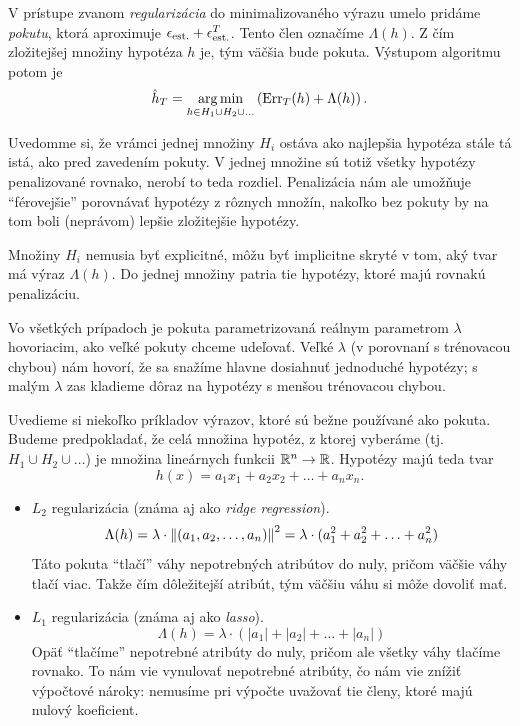V prístupe zvanom \emph{regularizácia} do minimalizovaného výrazu umelo
pridáme \emph{pokutu}, ktorá aproximuje ${\epsilon_\text{est.}} + {\epsilon^T_\text{est.}}$. Tento člen
označíme $\Lambda(h)$. Z čím zložitejšej množiny hypotéza $h$ je, tým
väčšia bude pokuta. Výstupom algoritmu potom je
$$\hat{h}_T = \operatorname*{{arg\,min}}_{h \in H_1 \cup H_2 \cup \ldots} \left( \mathrm{Err}_T(h) + \Lambda(h) \right).$$

Uvedomme si, že vrámci jednej množiny $H_i$ ostáva ako najlepšia
hypotéza stále tá istá, ako pred zavedením pokuty. V jednej množine
sú totiž všetky hypotézy penalizované rovnako, nerobí to teda rozdiel.
Penalizácia nám ale umožňuje ``férovejšie'' porovnávať hypotézy z rôznych
množín, nakoľko bez pokuty by na tom boli (neprávom) lepšie
zložitejšie hypotézy.

Množiny $H_i$ nemusia byť explicitné, môžu byť implicitne skryté v tom,
aký tvar má výraz $\Lambda(h)$. Do jednej množiny patria tie hypotézy,
ktoré majú rovnakú penalizáciu.

Vo všetkých prípadoch je pokuta parametrizovaná reálnym
parametrom $\lambda$ hovoriacim, ako veľké pokuty chceme udeľovať.
Veľké $\lambda$ (v porovnaní s trénovacou chybou) nám hovorí, že sa
snažíme hlavne dosiahnuť jednoduché hypotézy; s malým $\lambda$ zas
kladieme dôraz na hypotézy s menšou trénovacou chybou.

Uvedieme si niekoľko príkladov výrazov, ktoré sú bežne používané ako
pokuta. Budeme predpokladať, že celá množina hypotéz, z ktorej vyberáme
(tj. $H_1 \cup H_2 \cup \ldots$) je množina lineárnych funkcii
$\mathbb{R}^n \to \mathbb{R}$. Hypotézy majú teda tvar
$$h(x) = a_1x_1 + a_2x_2 + \ldots + a_nx_n.$$
\begin{itemize}
  \item $L_2$ regularizácia (známa aj ako \emph{ridge regression}).
    $$ \Lambda(h) = \lambda \cdot \left\lVert(a_1, a_2, \ldots, a_n)\right\rVert^2 = \lambda \cdot (a_1^2 + a_2^2 + \ldots + a_n^2) $$
    Táto pokuta ``tlačí'' váhy nepotrebných atribútov do nuly, pričom
    väčšie váhy tlačí viac. Takže čím dôležitejší atribút, tým väčšiu
    váhu si môže dovoliť mať.
  \item $L_1$ regularizácia (známa aj ako \emph{lasso}).
    $$ \Lambda(h) = \lambda \cdot (|a_1| + |a_2| + \ldots + |a_n|) $$
    Opäť ``tlačíme'' nepotrebné atribúty do nuly, pričom ale všetky
    váhy tlačíme rovnako. To nám vie vynulovať nepotrebné atribúty,
    čo nám vie znížiť výpočtové nároky: nemusíme pri výpočte uvažovať
    tie členy, ktoré majú nulový koeficient.
\end{itemize}

